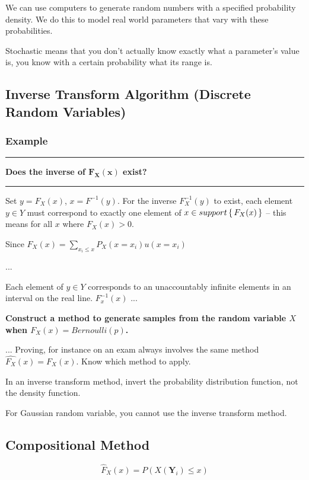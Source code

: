\documentclass{report}
\newcommand{\ex}{\noindent\rule{\linewidth}{0.2pt}}
\begin{document}
We can use computers to generate random numbers with a specified probability density. We do this to model real world parameters that vary with these probabilities.

Stochastic means that you don't actually know exactly what a parameter's value is, you know with a certain probability what its range is.

\subsection{Inverse Transform Algorithm (Discrete Random Variables)}

\subsubsection*{Example}



\ex

\textbf{Does the inverse of $\mathbf{F_X(x)}$ exist?}

\ex

Set $y=F_X(x)$, $x=F^{-1}(y)$. For the inverse $F_X^{-1}(y)$ to exist, each element $y \in Y$ must correspond to exactly one element of $x \in support \set{F_X(x)}$ -- this means for all $x$ where $F_X(x) > 0$.

Since $F_X(x) = \sum_{x_i \leq x} P_X(x = x_i) u(x=x_i)$

...

Each element of $y \in Y$ corresponds to an unaccountably infinite elements in an interval on the real line. $F_x^{-1}(x)$ ...


\textbf{Construct a method to generate samples from the random variable $X$ when $F_X(x) = Bernoulli(p)$.}

... Proving, for instance on an exam always involves the same method $\hat{F_X}(x) = F_X(x)$. Know which method to apply. 

In an inverse transform method, invert the probability distribution function, not the density function.

For Gaussian random variable, you cannot use the inverse transform method.

\subsection{Compositional Method}

$$\hat{F}_X(x) = P(X(\mathbf{Y}_i) \leq x)$$
\end{document}
